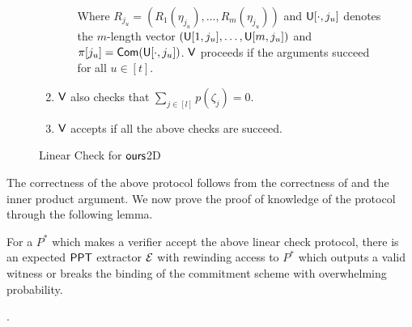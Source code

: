 \begin{figure}[h!]
\begin{framed}
\begin{enumerate}[{\rm 1.}]
\begin{itemize}
	Where $R_{j_u} = (R_1( \eta_{j_u}) , \ldots , R_m( \eta_{j_u}))$ and $\mathsf{U}[\cdot,j_u]$ denotes the $m$-length vector $(\mathsf{U}[1,j_u], \ldots, \mathsf{U}[m,j_u])$ and $\pi[j_u] = \mathsf{Com}(\mathsf{U}[\cdot, j_u])$. $\mathsf{V}$ proceeds if the arguments succeed for all $u \in [t]$.
	\end{itemize} 

	\item $\mathsf{V}$ also checks that $\sum_{j\in[l]} p(\zeta_j)=0$.
	
	\item $\mathsf{V}$ accepts if all the above checks are succeed.	  
\end{enumerate}
\end{framed}
\caption{Linear Check for $\textsf{ours}$2D}
\end{figure}
The correctness of the above protocol follows from the correctness of \cite{ligero} and the inner product argument. We now prove the proof of knowledge of the protocol through the following lemma.
\begin{lemma}
For a $P^*$ which makes a verifier accept the above linear check protocol, there is an expected $\mathsf{PPT}$ extractor $\mathcal{E}$ with rewinding access to $P^*$ which outputs a valid witness or breaks the binding of the commitment scheme with overwhelming probability.
\end{lemma}
.
